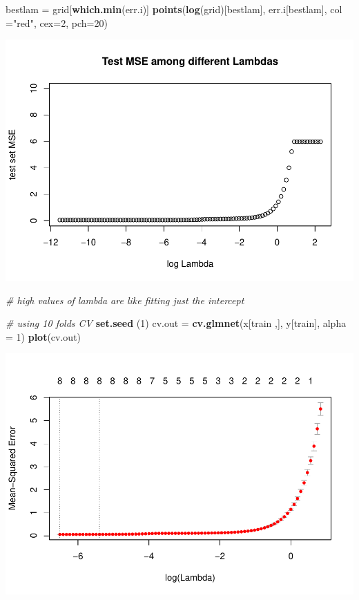 \documentclass[]{article}
\newenvironment{Shaded}{\begin{snugshade}}{\end{snugshade}}
\newcommand{\KeywordTok}[1]{\textcolor[rgb]{0.13,0.29,0.53}{\textbf{#1}}}
\newcommand{\DataTypeTok}[1]{\textcolor[rgb]{0.13,0.29,0.53}{#1}}
\newcommand{\DecValTok}[1]{\textcolor[rgb]{0.00,0.00,0.81}{#1}}
\newcommand{\StringTok}[1]{\textcolor[rgb]{0.31,0.60,0.02}{#1}}
\newcommand{\CommentTok}[1]{\textcolor[rgb]{0.56,0.35,0.01}{\textit{#1}}}
\newcommand{\NormalTok}[1]{#1}
\begin{document}
\begin{Shaded}
\begin{Highlighting}[]
\NormalTok{bestlam =}\StringTok{ }\NormalTok{grid[}\KeywordTok{which.min}\NormalTok{(err.i)]}
\KeywordTok{points}\NormalTok{(}\KeywordTok{log}\NormalTok{(grid)[bestlam], err.i[bestlam], }\DataTypeTok{col =}\StringTok{"red"}\NormalTok{, }\DataTypeTok{cex=}\DecValTok{2}\NormalTok{, }\DataTypeTok{pch=}\DecValTok{20}\NormalTok{)}
\end{Highlighting}
\end{Shaded}

\includegraphics{TSLproject_files/figure-latex/unnamed-chunk-17-2.pdf}

\begin{Shaded}
\begin{Highlighting}[]
\CommentTok{# high values of lambda are like fitting just the intercept}

\CommentTok{# using 10 folds CV}
\KeywordTok{set.seed}\NormalTok{ (}\DecValTok{1}\NormalTok{)}
\NormalTok{cv.out =}\StringTok{ }\KeywordTok{cv.glmnet}\NormalTok{(x[train ,], y[train], }\DataTypeTok{alpha =} \DecValTok{1}\NormalTok{)}
\KeywordTok{plot}\NormalTok{(cv.out)}
\end{Highlighting}
\end{Shaded}

\includegraphics{TSLproject_files/figure-latex/unnamed-chunk-17-3.pdf}
\end{document}
